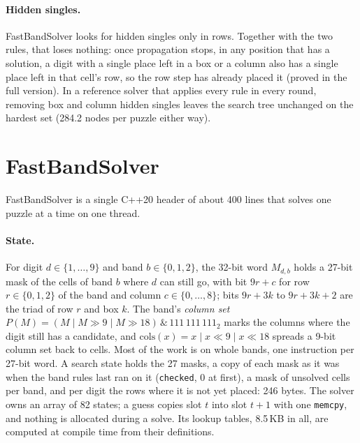 \documentclass[11pt]{article}
\theoremstyle{definition}
\theoremstyle{plain}
\begin{document}
\paragraph{Hidden singles.} FastBandSolver looks for hidden singles only in rows. Together with the two rules, that
loses nothing: once propagation stops, in any position that has a solution, a digit with a single place left in a box
or a column also has a single place left in that cell's row, so the row step has already placed it (proved in the full
version). In a reference solver that applies every rule in every round, removing box and column hidden singles leaves
the search tree unchanged on the hardest set (284.2 nodes per puzzle either way).


\section{FastBandSolver}
\label{sec:solver}

FastBandSolver is a single C++20 header of about 400 lines that solves one puzzle at a time on one thread.

\paragraph{State.} For digit $d\in\{1,\dots,9\}$ and band $b\in\{0,1,2\}$, the 32-bit word $M_{d,b}$ holds a 27-bit
mask of the cells of band $b$ where $d$ can still go, with bit $9r+c$ for row $r\in\{0,1,2\}$ of the band and column
$c\in\{0,\dots,8\}$; bits $9r+3k$ to $9r+3k+2$ are the triad of row $r$ and box $k$. The band's \emph{column set}
$P(M)=(M \mid M\gg 9 \mid M\gg 18)\,\&\,111\,111\,111_2$ marks the columns where the digit still has a candidate, and
$\mathrm{cols}(x)=x \mid x\ll 9 \mid x\ll 18$ spreads a 9-bit column set back to cells. Most of the work is on whole
bands, one instruction per 27-bit word. A search state holds the 27 masks, a copy of each mask as it was when the band
rules last ran on it (\texttt{checked}, 0 at first), a mask of unsolved cells per band, and per digit the rows where
it is not yet placed: 246 bytes. The solver owns an array of 82 states; a guess copies slot $t$ into slot $t+1$ with
one \texttt{memcpy}, and nothing is allocated during a solve. Its lookup tables, 8.5\,KB in all, are computed at
compile time from their definitions.
\end{document}
